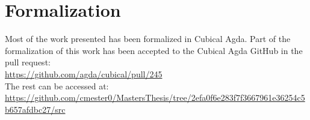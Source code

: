 \documentclass[twoside,11pt,openright]{report}
\theoremstyle{plain} %
\theoremstyle{definition}
\theoremstyle{remark}
\begin{document}
\cleardoublepage
\appendix

\chapter{Formalization}
Most of the work presented has been formalized in Cubical Agda. Part of the formalization of this work has been accepted to the Cubical Agda GitHub in the pull request:\\
\url{https://github.com/agda/cubical/pull/245}\\
The rest can be accessed at:\\
{\small\url{https://github.com/cmester0/MastersThesis/tree/2efa0f6e283f7f3667961e36254c5b657afdbc27/src}}
\end{document}
